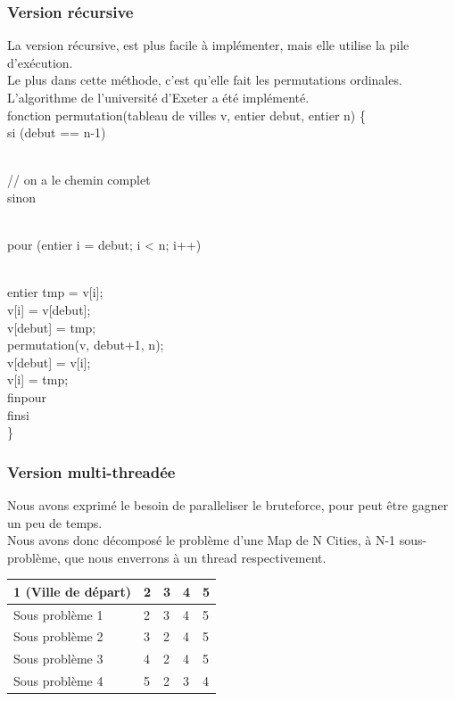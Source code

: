 \documentclass[12pt]{report}
\begin{document}
{\subsubsection{Version récursive}

La version récursive, est plus facile à implémenter, mais elle utilise la pile d'exécution. \\
Le plus dans cette méthode, c'est qu'elle fait les permutations ordinales. \\

L'algorithme de l'université d'Exeter a été implémenté. \\

fonction permutation(tableau de villes v, entier debut, entier n)
\{  \\
\indent si (debut == n-1) { \\
\indent \indent  // on a le chemin complet\\
\indent sinon {\\
\indent \indent pour (entier i = debut; i < n; i++) {\\
\indent \indent \indent entier tmp = v[i];\\
      
\indent \indent \indent v[i] = v[debut];\\
\indent \indent \indent v[debut] = tmp;\\
\indent \indent \indent permutation(v, debut+1, n);\\
\indent \indent \indent v[debut] = v[i];\\
\indent \indent \indent v[i] = tmp;\\
\indent \indent finpour\\
\indent finsi \\
\}

\subsubsection{Version multi-threadée}

Nous avons exprimé le besoin de paralleliser le bruteforce, pour peut être gagner un peu de temps. \\
Nous avons donc décomposé le problème d'une Map de N Cities, à N-1 sous-problème, que nous enverrons à un thread respectivement. \\


    \begin{tabular}{|l|l|l|l|l|}
    \hline
    1 (Ville de départ) & 2 & 3 & 4 & 5 \\ \hline
    Sous problème 1     & 2 & 3 & 4 & 5 \\ \hline
    Sous problème 2     & 3 & 2 & 4 & 5 \\ \hline
    Sous problème 3     & 4 & 2 & 4 & 5 \\ \hline
    Sous problème 4     & 5 & 2 & 3 & 4 \\ \hline
    \end{tabular}\\
   

}}}}
\end{document}
